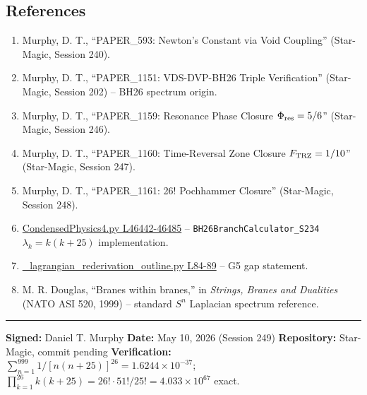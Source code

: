 \documentclass[
]{article}
\providecommand{\tightlist}{%
  \setlength{\itemsep}{0pt}\setlength{\parskip}{0pt}}
\begin{document}
\subsection{References}\label{references}

\begin{enumerate}
\def\labelenumi{\arabic{enumi}.}
\tightlist
\item
  Murphy, D. T., ``PAPER\_593: Newton's Constant via Void Coupling''
  (Star-Magic, Session 240).
\item
  Murphy, D. T., ``PAPER\_1151: VDS-DVP-BH26 Triple Verification''
  (Star-Magic, Session 202) -- BH26 spectrum origin.
\item
  Murphy, D. T., ``PAPER\_1159: Resonance Phase Closure
  \(\Phi_{\rm res}=5/6\)'' (Star-Magic, Session 246).
\item
  Murphy, D. T., ``PAPER\_1160: Time-Reversal Zone Closure
  \(F_{\rm TRZ}=1/10\)'' (Star-Magic, Session 247).
\item
  Murphy, D. T., ``PAPER\_1161: 26! Pochhammer Closure'' (Star-Magic,
  Session 248).
\item
  \href{CondensedPhysics4.py\#L46442}{CondensedPhysics4.py L46442-46485}
  -- \texttt{BH26BranchCalculator\_S234} \(\lambda_k = k(k+25)\)
  implementation.
\item
  \href{_lagrangian_rederivation_outline.py\#L84}{\_lagrangian\_rederivation\_outline.py
  L84-89} -- G5 gap statement.
\item
  M. R. Douglas, ``Branes within branes,'' in \emph{Strings, Branes and
  Dualities} (NATO ASI 520, 1999) -- standard \(S^{n}\) Laplacian
  spectrum reference.
\end{enumerate}

\begin{center}\rule{0.5\linewidth}{0.5pt}\end{center}

\textbf{Signed:} Daniel T. Murphy \textbf{Date:} May 10, 2026 (Session
249) \textbf{Repository:} Star-Magic, commit pending
\textbf{Verification:}
\(\sum_{n=1}^{999}1/[n(n+25)]^{26} = 1.6244\times10^{-37}\);
\(\prod_{k=1}^{26}k(k+25) = 26!\cdot 51!/25! = 4.033\times10^{67}\)
exact.
\end{document}
